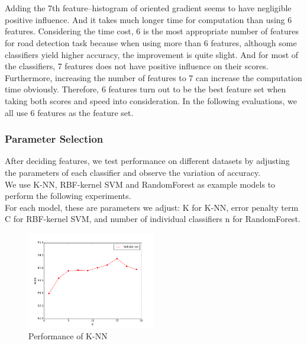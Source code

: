 \documentclass{article} %
\begin{document}
\\
\\
Adding the 7th feature--histogram of oriented gradient seems to have negligible positive influence. And it takes much longer time for computation than using 6 features. Considering the time cost, 6 is the most appropriate number of features for road detection task because when using more than 6 features, although some classifiers yield higher accuracy, the improvement is quite slight. And for most of the classifiers, 7 features does not have positive influence on their scores. Furthermore, increasing the number of features to 7 can increase the computation time obviously. Therefore, 6 features turn out to be the best feature set when taking both scores and speed into consideration. In the following evaluations, we all use 6 features as the feature set.

\subsubsection{Parameter Selection}
After deciding features, we test performance on different datasets by adjusting the parameters of each classifier and observe the variation of accuracy.\\

We use K-NN, RBF-kernel SVM and RandomForest as example models to perform the following experiments.\\

For each model, these are parameters we adjust: K for K-NN, error penalty term C for RBF-kernel SVM, and number of individual classifiers n for RandomForest.\\
\begin{figure}[h]
\centering
\includegraphics[width=0.5\textwidth]{3.png}
\caption{Performance of K-NN}
\end{figure}
\end{document}
